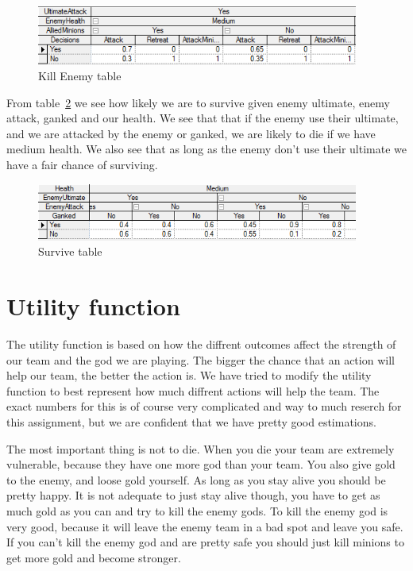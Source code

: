 \documentclass[titlepage]{article}
\begin{document}
\begin{figure}[H]
\includegraphics[width=400px]{KillEnemy.PNG}
\caption{Kill Enemy table}
\label{fig:KillEnemy}
\end{figure}

From table~\ref{fig:Survive} we see how likely we are to survive given enemy ultimate, enemy attack, ganked and our health.
We see that that if the enemy use their ultimate, and we are attacked by the enemy or ganked, we are likely to die if we have medium health. We also see that as long as the enemy don't use their ultimate we have a fair chance of surviving.

\begin{figure}[H]
\includegraphics[width=400px]{SurviveTable.PNG}
\caption{Survive table}
\label{fig:Survive}
\end{figure}

\section{Utility function}The utility function is based on how the diffrent outcomes affect the strength of our team and the god we are playing. The bigger the chance that an action will help our team, the better the action is. We have tried to modify the utility function to best represent how much diffrent actions will help the team. The exact numbers for this is of course very complicated and way to much reserch for this assignment, but we are confident that we have pretty good estimations. 

The most important thing is not to die. When you die your team are extremely vulnerable, because they have one more god than your team. You also give gold to the enemy, and loose gold yourself. As long as you stay alive you should be pretty happy. It is not adequate to just stay alive though, you have to get as much gold as you can and try to kill the enemy gods. To kill the enemy god is very good, because it will leave the enemy team in a bad spot and leave you safe. If you can't kill the enemy god and are pretty safe you should just kill minions to get more gold and become stronger.
\end{document}

